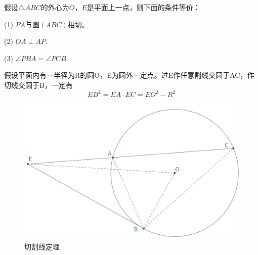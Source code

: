 \begin{proposition}[切线准则]
假设$\triangle ABC$的外心为$O$，$E$是平面上一点，则下面的条件等价：

(1) $PA$与圆$(ABC)$相切。

(2) $OA \perp AP.$

(3) $\angle PBA = \angle PCB.$
\end{proposition}

\begin{theorem}[切割线定理]
    假设平面内有一半径为R的圆O，E为圆外一定点。过E作任意割线交圆于AC，作切线交圆于B，一定有
    $$
    EB^2 = EA \cdot EC = EO^2 - R^2
    $$
\end{theorem}
\begin{figure}[H]
    \centering
    \includegraphics[width=0.7\linewidth]{figures/切割弦定理.png}
    \caption{切割线定理}
\end{figure}


